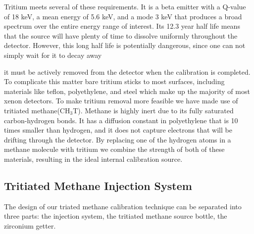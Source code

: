\documentclass[a4paper,12pt]{article}
\begin{document}
Tritium meets several of these requirements. It is a beta emitter with a Q-value of 18 keV, a mean energy of 5.6 keV, and a mode 3 keV that produces a broad spectrum over the entire energy range of interest. Its 12.3 year half life means that the source will have plenty of time to dissolve uniformly throughout the detector. However, this long half life is potentially dangerous, since one can not simply wait for it to decay away { it must be actively
removed from the detector when the calibration is completed. To complicate this matter bare tritium sticks to most surfaces, including materials like teflon, polyethylene, and steel which make up the majority of most xenon detectors. To make tritium removal more feasible we have made use of tritiated methane(CH$_3$T). Methane is highly inert due to its fully saturated carbon-hydrogen bonds. It has a diffusion constant in polyethylene that is 10 times smaller than
hydrogen, and it does not capture electrons that will be drifting through the detector. By replacing one of the hydrogen atoms in a methane molecule with tritium we combine the strength of both of these materials, resulting in the ideal internal calibration source.

\subsection{Tritiated Methane Injection System}

The design of our triated methane calibration technique can be separated into three parts: the injection system, the tritiated methane source bottle, the zirconium getter.

}
\end{document}
